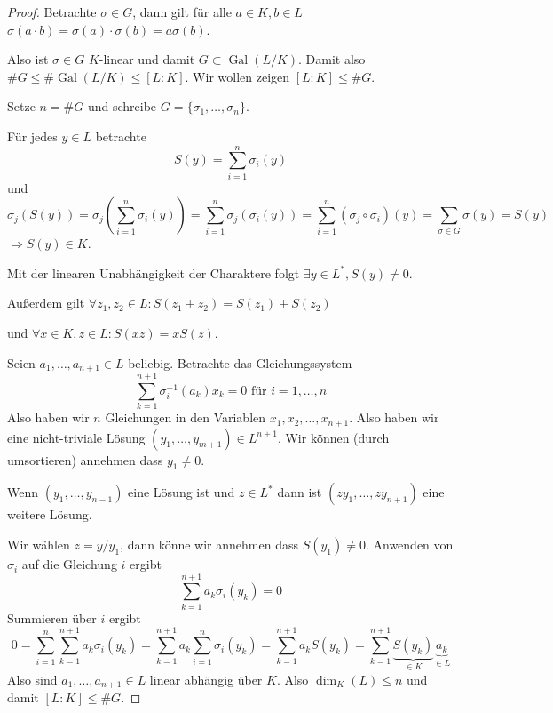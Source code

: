 \documentclass[a4paper,12pt,numbers=noenddot,parskip=full]{scrartcl}
\DeclareMathOperator{\Gal}{Gal}
\theoremstyle{dotless}
\theoremstyle{remark}
\begin{document}
	\begin{proof}
		Betrachte $\sigma \in G$, dann gilt für alle $a \in K, b \in L$ $\sigma(a \cdot b) = \sigma(a) \cdot \sigma(b) = a \sigma(b)$.
		
		Also ist $\sigma \in G$ $K$-linear und damit $G \subset \Gal(L/K)$. Damit also $\#G \leq \#\Gal(L/K) \leq [L:K]$. Wir wollen zeigen $[L:K] \leq \#G$.
		
		Setze $n = \#G$ und schreibe $G = \{ \sigma_1, \dots, \sigma_n \}$.
		
		Für jedes $y \in L$ betrachte
		\begin{equation*}
			S(y) = \sum_{i = 1}^n \sigma_i(y)
		\end{equation*}
		und
		\begin{equation*}
			\sigma_j(S(y)) = \sigma_j \left( \sum_{i = 1}^n \sigma_i(y) \right) = \sum_{i = 1}^n \sigma_j(\sigma_i(y)) = \sum_{i = 1}^n (\sigma_j \circ \sigma_i)(y) = \sum_{\sigma \in G} \sigma(y) = S(y)
		\end{equation*}
		$\Rightarrow S(y) \in K$.
		
		Mit der linearen Unabhängigkeit der Charaktere folgt $\exists y \in L^*, S(y) \neq 0$.
		
		Außerdem gilt $\forall z_1, z_2 \in L: S(z_1 + z_2) = S(z_1) + S(z_2)$
		
		und $\forall x \in K, z \in L: S(xz) = x S(z)$.
		
		Seien $a_1, \dots, a_{n+1} \in L$ beliebig. Betrachte das Gleichungssystem
		\begin{equation*}
			\sum_{k = 1}^{n+1} \sigma_i^{-1}(a_k) x_k = 0 \text{ für $i = 1, \dots, n$}
		\end{equation*}
		Also haben wir $n$ Gleichungen in den Variablen $x_1, x_2, \dots, x_{n+1}$. Also haben wir eine nicht-triviale Lösung $(y_1, \dots, y_{m+1}) \in L^{n+1}$. Wir können (durch umsortieren) annehmen dass $y_1 \neq 0$.
		
		Wenn $(y_1, \dots, y_{n-1})$ eine Lösung ist und $z \in L^*$ dann ist $(zy_1, \dots, zy_{n+1})$ eine weitere Lösung.
		
		Wir wählen $z = y/y_1$, dann könne wir annehmen dass $S(y_1) \neq 0$. Anwenden von $\sigma_i$ auf die Gleichung $i$ ergibt
		\begin{equation*}
			\sum_{k = 1}^{n+1} a_k \sigma_i(y_k) = 0
		\end{equation*}
		Summieren über $i$ ergibt
		\begin{equation*}
			0 = \sum_{i = 1}^n \sum_{k = 1}^{n+1} a_k \sigma_i(y_k) = \sum_{k = 1}^{n+1} a_k \sum_{i = 1}^n \sigma_i(y_k) = \sum_{k = 1}^{n+1} a_k S(y_k) = \sum_{k = 1}^{n+1} \underbrace{S(y_k)}_{\in K} \underbrace{a_k}_{\in L}
		\end{equation*}
		Also sind $a_1, \dots, a_{n+1} \in L$ linear abhängig über $K$. Also $\dim_K(L) \leq n$ und damit $[L:K] \leq \#G$.
	\end{proof}
\end{document}
